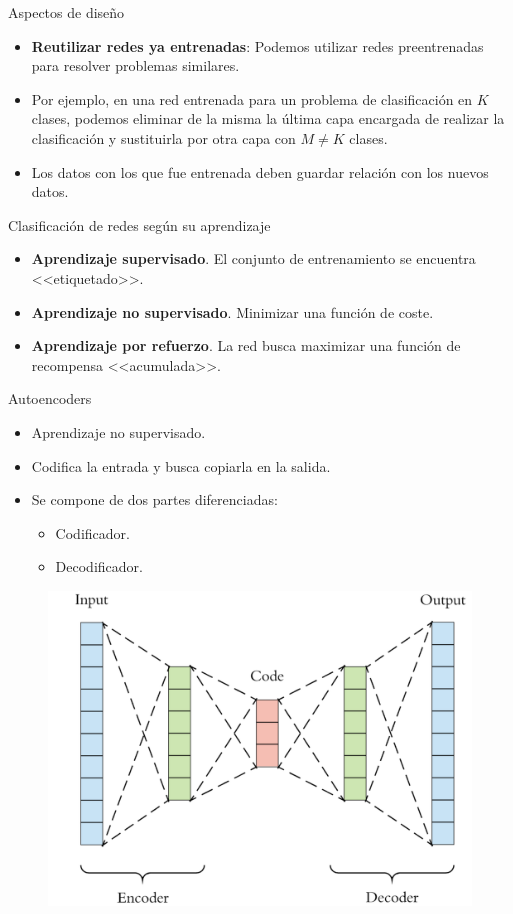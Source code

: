 \documentclass[spanish]{beamer}
\begin{document}
\begin{frame}{Aspectos de diseño}
  \begin{itemize}
    \item \textbf{Reutilizar redes ya entrenadas}: Podemos utilizar redes preentrenadas para resolver problemas similares.

    \item Por ejemplo, en una red entrenada para un problema de clasificación en $K$ clases, podemos eliminar de la misma la última capa encargada de realizar la clasificación y sustituirla por otra capa con $M \neq K$ clases.

    \item Los datos con los que fue entrenada deben guardar relación con los nuevos datos.
  \end{itemize}

\end{frame}

\begin{frame}{Clasificación de redes según su aprendizaje}
      \begin{itemize}
      \item \textbf{Aprendizaje supervisado}. El conjunto de entrenamiento se
        encuentra <<etiquetado>>.
      \item \textbf{Aprendizaje no supervisado}. Minimizar una función de coste.
      \item \textbf{Aprendizaje por refuerzo}. La red busca maximizar una función de
        recompensa <<acumulada>>.
      \end{itemize}
\end{frame}

\begin{frame}{Autoencoders}
\begin{itemize}
\item Aprendizaje no supervisado.
\item Codifica la entrada y busca copiarla en la salida.
\item Se compone de dos partes diferenciadas:
  \begin{itemize}
    \item Codificador.
    \item Decodificador.
  \end{itemize}
\end{itemize}
\begin{figure}[h]
  \centering
  \includegraphics[width=.6\textwidth]{img/autoencoder}
\end{figure}
\end{frame}
\end{document}
